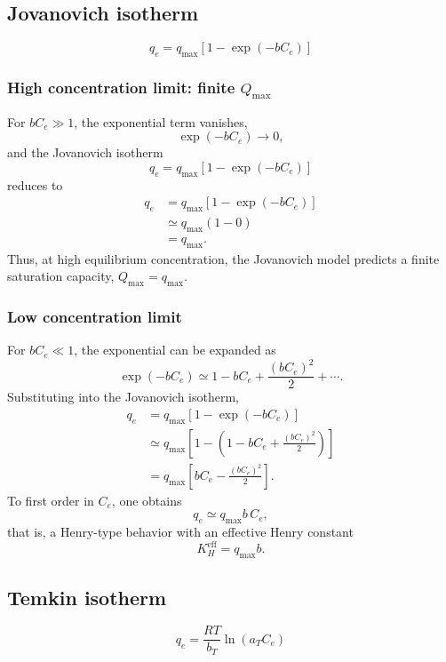 \documentclass[12pt]{article}
\begin{document}
	\subsection{Jovanovich isotherm}
	\[
	q_e = q_{\max} \left[1 - \exp(-b C_e)\right]
	\]
	
	\subsubsection{High concentration limit: finite $Q_{\max}$}
	
	For $b C_e \gg 1$, the exponential term vanishes,
	\[
	\exp(-b C_e) \to 0,
	\]
	and the Jovanovich isotherm
	\[
	q_e = q_{\max} \left[1 - \exp(-b C_e)\right]
	\]
	reduces to
	\begin{align}
		q_e 
		&= q_{\max} \left[1 - \exp(-b C_e)\right] \nonumber \\
		&\simeq q_{\max} (1 - 0) \nonumber \\
		&= q_{\max}.
	\end{align}
	Thus, at high equilibrium concentration, the Jovanovich model predicts a finite saturation capacity, $Q_{\max} = q_{\max}$.
	
	\subsubsection{Low concentration limit}
	
	For $b C_e \ll 1$, the exponential can be expanded as
	\[
	\exp(-b C_e) \simeq 1 - b C_e + \frac{(b C_e)^2}{2} + \cdots.
	\]
	Substituting into the Jovanovich isotherm,
	\begin{align}
		q_e
		&= q_{\max} \left[1 - \exp(-b C_e)\right] \nonumber \\
		&\simeq q_{\max} \left[1 - \left(1 - b C_e + \frac{(b C_e)^2}{2}\right)\right] \nonumber \\
		&= q_{\max} \left[b C_e - \frac{(b C_e)^2}{2}\right].
	\end{align}
	To first order in $C_e$, one obtains
	\begin{equation}
		q_e \simeq q_{\max} b\, C_e,
	\end{equation}
	that is, a Henry-type behavior with an effective Henry constant
	\begin{equation}
		K_H^{\mathrm{eff}} = q_{\max} b.
	\end{equation}
	
	
	\subsection{Temkin isotherm}
	\[
	q_e = \frac{RT}{b_T} \ln(a_T C_e)
	\]
	
\end{document}
